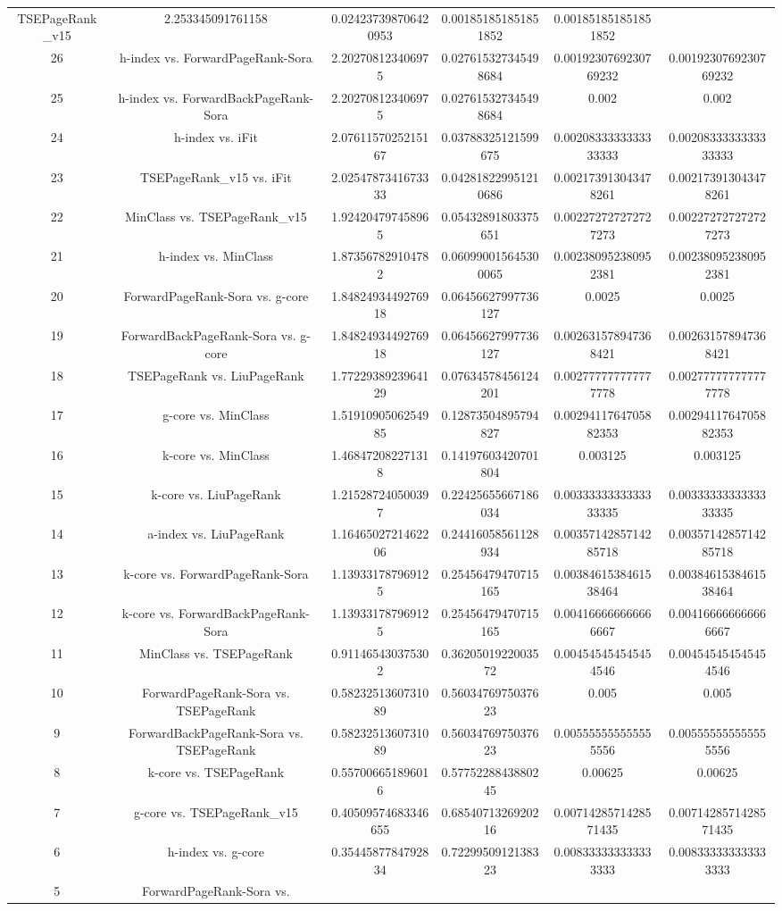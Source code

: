 \documentclass[a4paper,10pt]{article}
\begin{document}
\begin{landscape}
\begin{table}[!htp]
\begin{tabular}{cccccc}
TSEPageRank_v15&2.253345091761158&0.024237398706420953&0.001851851851851852&0.001851851851851852\\26&h-index vs. ForwardPageRank-Sora&2.202708123406975&0.027615327345498684&0.0019230769230769232&0.0019230769230769232\\25&h-index vs. ForwardBackPageRank-Sora&2.202708123406975&0.027615327345498684&0.002&0.002\\24&h-index vs. iFit&2.0761157025215167&0.03788325121599675&0.0020833333333333333&0.0020833333333333333\\23&TSEPageRank_v15 vs. iFit&2.0254787341673333&0.042818229951210686&0.002173913043478261&0.002173913043478261\\22&MinClass vs. TSEPageRank_v15&1.924204797458965&0.05432891803375651&0.002272727272727273&0.002272727272727273\\21&h-index vs. MinClass&1.873567829104782&0.060990015645300065&0.002380952380952381&0.002380952380952381\\20&ForwardPageRank-Sora vs. g-core&1.8482493449276918&0.06456627997736127&0.0025&0.0025\\19&ForwardBackPageRank-Sora vs. g-core&1.8482493449276918&0.06456627997736127&0.002631578947368421&0.002631578947368421\\18&TSEPageRank vs. LiuPageRank&1.7722938923964129&0.07634578456124201&0.002777777777777778&0.002777777777777778\\17&g-core vs. MinClass&1.5191090506254985&0.12873504895794827&0.0029411764705882353&0.0029411764705882353\\16&k-core vs. MinClass&1.468472082271318&0.14197603420701804&0.003125&0.003125\\15&k-core vs. LiuPageRank&1.215287240500397&0.22425655667186034&0.0033333333333333335&0.0033333333333333335\\14&a-index vs. LiuPageRank&1.1646502721462206&0.24416058561128934&0.0035714285714285718&0.0035714285714285718\\13&k-core vs. ForwardPageRank-Sora&1.139331787969125&0.25456479470715165&0.0038461538461538464&0.0038461538461538464\\12&k-core vs. ForwardBackPageRank-Sora&1.139331787969125&0.25456479470715165&0.004166666666666667&0.004166666666666667\\11&MinClass vs. TSEPageRank&0.911465430375302&0.3620501922003572&0.004545454545454546&0.004545454545454546\\10&ForwardPageRank-Sora vs. TSEPageRank&0.5823251360731089&0.5603476975037623&0.005&0.005\\9&ForwardBackPageRank-Sora vs. TSEPageRank&0.5823251360731089&0.5603476975037623&0.005555555555555556&0.005555555555555556\\8&k-core vs. TSEPageRank&0.557006651896016&0.5775228843880245&0.00625&0.00625\\7&g-core vs. TSEPageRank_v15&0.40509574683346655&0.6854071326920216&0.0071428571428571435&0.0071428571428571435\\6&h-index vs. g-core&0.3544587784792834&0.7229950912138323&0.008333333333333333&0.008333333333333333\\5&ForwardPageRank-Sora vs. 
\end{tabular}
\end{table}
\end{landscape}
\end{document}
